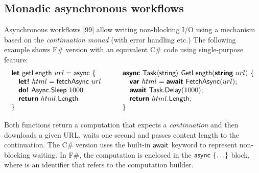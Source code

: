 \documentclass[runningheads,a4paper]{llncs}
\begin{document}

\subsection{Monadic asynchronous workflows}
\label{sec:intro-async}

Asynchronous workflows [99] allow writing non-blocking I/O using a mechanism based on the 
\emph{continuation monad} (with error handling etc.) The following example shows F\# version
with an equivalent C\# code using single-purpose feature:
%
\begin{equation*}
\begin{array}{l}
\kvd{let}~\ident{getLength}~url=\ident{async}~\{\\
\quad \kvd{let!}~html = \ident{fetchAsync}~url\\
\quad \kvd{do!}~\ident{Async}.\ident{Sleep}~1000\\
\quad \kvd{return}~html.\ident{Length}\\
\}
\end{array}\qquad
\begin{array}{l}
\kvd{async}~\ident{Task}\langle\ident{string}\rangle~\ident{GetLength}(\kvd{string}~url)~\{\\
\quad \kvd{var}~html = \kvd{await}~\ident{FetchAsync}(url);\\
\quad \kvd{await}~\ident{Task}.\ident{Delay}(1000);\\
\quad \kvd{return}~html.\ident{Length};\\
\}
\end{array}
\end{equation*}

Both functions return a computation that expects a \emph{continuation} and then downloads a given 
URL, waits one second and passes content length to the continuation. The C\# version uses the built-in
$\textnormal{\sffamily await}$ keyword to represent non-blocking waiting. In F\#, the computation is enclosed
in the $\textnormal{\sffamily async}~\{ \ldots \}$ block, where  is an identifier that refers to
the computation builder. 
\end{document}

